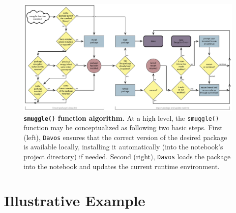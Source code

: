 \documentclass[preprint,12pt,a4paper]{elsarticle}
\begin{document}
\begin{figure}[tp]
\centering
\includegraphics[width=\textwidth]{figs/flow_chart}
\caption{\small \textbf{\texttt{smuggle()} function algorithm.} At a
  high level, the \texttt{smuggle()} function may be conceptualized as
  following two basic steps. First (left), \texttt{Davos} ensures that the
  correct version of the desired package is available locally, installing
  it automatically (into the notebook's project directory) if needed. Second (right),
  \texttt{Davos} loads the package into the notebook and updates the current
  runtime environment.}
\label{fig:flow-chart}
\end{figure}

\section{Illustrative Example}\label{sec:illustrative-example}
\end{document}
